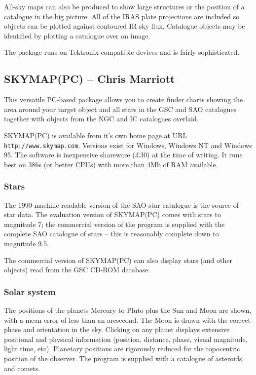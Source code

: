 \documentclass[twoside,11pt]{article}
\newcommand{\htmladdnormallink}[2]{#1}
\newcommand{\xlabel}[1]{}
\newcommand{\SKYMAPPCref}{\htmladdnormallink{SKYMAP(PC)}{http://www.skymap.com}}
\newcommand{\GSCref}{\htmladdnormallink{GSC}{http://www-gsss.stsci.edu/casbhome.html}}
\newcommand{\HTTPCref}{\htmladdnormallink{\tt http://www.skymap.com}{http://www.skymap.com}}
\begin{document}
All-sky maps can also be produced to show large structures or
the position of a catalogue in the big picture. All of the IRAS plate projections
 are included so objects can be plotted
against contoured IR sky flux. Catalogue objects may be identified by
plotting a catalogue over an image.

The package runs on Tektronix-compatible devices and is fairly sophisticated.


\subsection{{\SKYMAPPCref} -- Chris Marriott} \xlabel{SKYMAPPC}
\label{sec:skymappc}

This versatile PC-based package allows you to create finder charts showing
the area around your target object and all stars in the {\GSCref} and SAO
catalogues together with objects from the NGC and IC catalogues overlaid.

{\SKYMAPPCref} is available from it's own home page at
URL {\HTTPCref}. Versions exist for Windows, Windows NT and Windows 95.
The software is inexpensive shareware (\pounds 30) at the time
of writing. It runs best on 386s (or better CPUs) with more than 4Mb of RAM
available.


\subsubsection{Stars}

The 1990 machine-readable version of the SAO star catalogue is the source of
star data. The evaluation version of {\SKYMAPPCref} comes with stars to magnitude 7;
the commercial version of the program is supplied with the complete SAO
catalogue of stars -- this is reasonably complete down to magnitude 9.5.

The commercial version of {\SKYMAPPCref} can also display stars (and other objects)
read from the {\GSCref} CD-ROM database.

\subsubsection{Solar system}

The positions of the planets Mercury to Pluto plus the Sun and Moon are
shown, with a mean error of less than an arcsecond. The Moon is drawn with
the correct phase and orientation in the sky. Clicking on any planet displays
extensive positional and physical information (position, distance, phase,
visual magnitude, light time, etc). Planetary positions are rigorously
reduced for the topocentric position of the observer.
The program is supplied with a catalogue of asteroids and comets.
\end{document}
